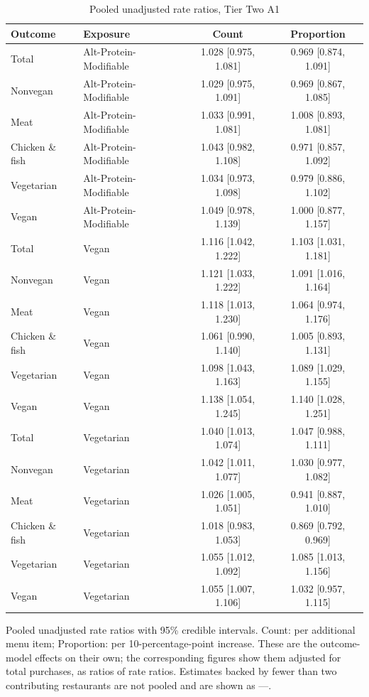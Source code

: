 \begin{table}[H]
\centering
\caption{Pooled unadjusted rate ratios, Tier Two A1}
\label{tab:rr_t2_a1}
\begin{tabular}{llcc}
\toprule
Outcome & Exposure & Count & Proportion \\
\midrule
Total & Alt-Protein-Modifiable & 1.028 [0.975, 1.081] & 0.969 [0.874, 1.091] \\
Nonvegan & Alt-Protein-Modifiable & 1.029 [0.975, 1.091] & 0.969 [0.867, 1.085] \\
Meat & Alt-Protein-Modifiable & 1.033 [0.991, 1.081] & 1.008 [0.893, 1.081] \\
Chicken \& fish & Alt-Protein-Modifiable & 1.043 [0.982, 1.108] & 0.971 [0.857, 1.092] \\
Vegetarian & Alt-Protein-Modifiable & 1.034 [0.973, 1.098] & 0.979 [0.886, 1.102] \\
Vegan & Alt-Protein-Modifiable & 1.049 [0.978, 1.139] & 1.000 [0.877, 1.157] \\
Total & Vegan & 1.116 [1.042, 1.222] & 1.103 [1.031, 1.181] \\
Nonvegan & Vegan & 1.121 [1.033, 1.222] & 1.091 [1.016, 1.164] \\
Meat & Vegan & 1.118 [1.013, 1.230] & 1.064 [0.974, 1.176] \\
Chicken \& fish & Vegan & 1.061 [0.990, 1.140] & 1.005 [0.893, 1.131] \\
Vegetarian & Vegan & 1.098 [1.043, 1.163] & 1.089 [1.029, 1.155] \\
Vegan & Vegan & 1.138 [1.054, 1.245] & 1.140 [1.028, 1.251] \\
Total & Vegetarian & 1.040 [1.013, 1.074] & 1.047 [0.988, 1.111] \\
Nonvegan & Vegetarian & 1.042 [1.011, 1.077] & 1.030 [0.977, 1.082] \\
Meat & Vegetarian & 1.026 [1.005, 1.051] & 0.941 [0.887, 1.010] \\
Chicken \& fish & Vegetarian & 1.018 [0.983, 1.053] & 0.869 [0.792, 0.969] \\
Vegetarian & Vegetarian & 1.055 [1.012, 1.092] & 1.085 [1.013, 1.156] \\
Vegan & Vegetarian & 1.055 [1.007, 1.106] & 1.032 [0.957, 1.115] \\
\bottomrule
\end{tabular}
\par\smallskip\footnotesize Pooled unadjusted rate ratios with 95\% credible intervals. Count: per additional menu item; Proportion: per 10-percentage-point increase. These are the outcome-model effects on their own; the corresponding figures show them adjusted for total purchases, as ratios of rate ratios. Estimates backed by fewer than two contributing restaurants are not pooled and are shown as ---.
\end{table}
